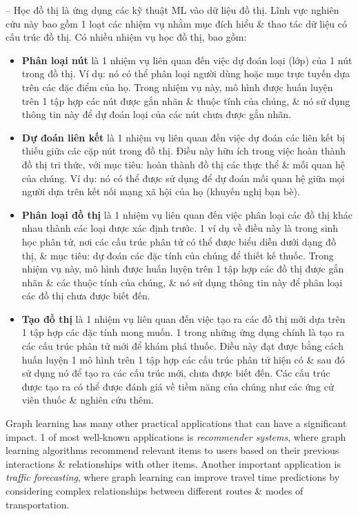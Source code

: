 \documentclass{article}
\begin{document}
\begin{itemize}
\begin{itemize}
\begin{itemize}
        \end{itemize}
        -- Học đồ thị là ứng dụng các kỹ thuật ML vào dữ liệu đồ thị. Lĩnh vực nghiên cứu này bao gồm 1 loạt các nhiệm vụ nhằm mục đích hiểu \& thao tác dữ liệu có cấu trúc đồ thị. Có nhiều nhiệm vụ học đồ thị, bao gồm:
        \begin{itemize}
            \item {\bf Phân loại nút} là 1 nhiệm vụ liên quan đến việc dự đoán loại (lớp) của 1 nút trong đồ thị. Ví dụ: nó có thể phân loại người dùng hoặc mục trực tuyến dựa trên các đặc điểm của họ. Trong nhiệm vụ này, mô hình được huấn luyện trên 1 tập hợp các nút được gắn nhãn \& thuộc tính của chúng, \& nó sử dụng thông tin này để dự đoán loại của các nút chưa được gắn nhãn.
            \item {\bf Dự đoán liên kết} là 1 nhiệm vụ liên quan đến việc dự đoán các liên kết bị thiếu giữa các cặp nút trong đồ thị. Điều này hữu ích trong việc hoàn thành đồ thị tri thức, với mục tiêu: hoàn thành đồ thị các thực thể \& mối quan hệ của chúng. Ví dụ: nó có thể được sử dụng để dự đoán mối quan hệ giữa mọi người dựa trên kết nối mạng xã hội của họ (khuyến nghị bạn bè).
            \item {\bf Phân loại đồ thị} là 1 nhiệm vụ liên quan đến việc phân loại các đồ thị khác nhau thành các loại được xác định trước. 1 ví dụ về điều này là trong sinh học phân tử, nơi các cấu trúc phân tử có thể được biểu diễn dưới dạng đồ thị, \& mục tiêu: dự đoán các đặc tính của chúng để thiết kế thuốc. Trong nhiệm vụ này, mô hình được huấn luyện trên 1 tập hợp các đồ thị được gắn nhãn \& các thuộc tính của chúng, \& nó sử dụng thông tin này để phân loại các đồ thị chưa được biết đến.
            \item {\bf Tạo đồ thị} là 1 nhiệm vụ liên quan đến việc tạo ra các đồ thị mới dựa trên 1 tập hợp các đặc tính mong muốn. 1 trong những ứng dụng chính là tạo ra các cấu trúc phân tử mới để khám phá thuốc. Điều này đạt được bằng cách huấn luyện 1 mô hình trên 1 tập hợp các cấu trúc phân tử hiện có \& sau đó sử dụng nó để tạo ra các cấu trúc mới, chưa được biết đến. Các cấu trúc được tạo ra có thể được đánh giá về tiềm năng của chúng như các ứng cử viên thuốc \& nghiên cứu thêm.
        \end{itemize}
        Graph learning has many other practical applications that can have a significant impact. 1 of most well-known applications is {\it recommender systems}, where graph learning algorithms recommend relevant items to users based on their previous interactions \& relationships with other items. Another important application is {\it traffic forecasting}, where graph learning can improve travel time predictions by considering complex relationships between different routes \& modes of transportation.


\end{itemize}
\end{itemize}
\end{document}
